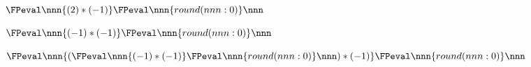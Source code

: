 \documentclass[10pt,a4paper]{article}
\newcommand{\NOP}[1]{
	\FPeval\nnn{(#1)*(-1)}%
	\FPeval\nnn{round(nnn:0)}%
	\nnn
}
\begin{document}
$\NOP{2}$

$\NOP{-1}$

$\NOP{\NOP{-1}}$
\end{document}
